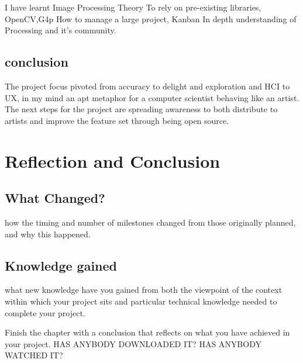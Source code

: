 \documentclass[a4paper]{report}
\begin{document}
I have learnt
	Image Processing Theory
    To rely on pre-existing libraries, OpenCV,G4p
    How to manage a large project, Kanban
    In depth understanding of Processing and it's community.
    
\section{conclusion}
The project focus pivoted from accuracy to delight and exploration and HCI to UX, in my mind an apt metaphor for a computer scientist behaving like an artist. The next steps for the project are spreading awareness to both distribute to artists and improve the feature set through being open source.

\chapter{Reflection and Conclusion}
\section{What Changed?}
how the timing and number of milestones changed from those originally planned, and why this happened.  
\section{Knowledge gained}
what new knowledge have you gained from both the viewpoint of the context within which your project sits and particular technical knowledge needed to complete your project.

Finish the chapter with a conclusion that reflects on what you have achieved in your project. HAS ANYBODY DOWNLOADED IT? HAS ANYBODY WATCHED IT?



\end{document}

